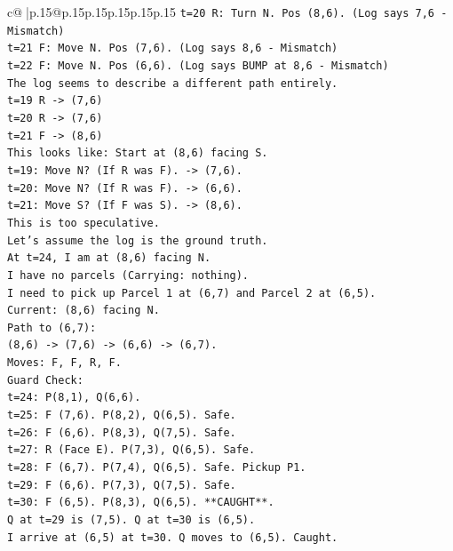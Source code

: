 \documentclass{article}
\begin{document}
{\begin{supertabular}{c@{$\;$}|p{.15\linewidth}@{}p{.15\linewidth}p{.15\linewidth}p{.15\linewidth}p{.15\linewidth}p{.15\linewidth}}
{{{\texttt{t=20 R: Turn N. Pos (8,6). (Log says 7,6 {-} Mismatch)} \\
\texttt{t=21 F: Move N. Pos (7,6). (Log says 8,6 {-} Mismatch)} \\
\texttt{t=22 F: Move N. Pos (6,6). (Log says BUMP at 8,6 {-} Mismatch)} \\
\texttt{The log seems to describe a different path entirely.} \\
\texttt{t=19 R {-}> (7,6)} \\
\texttt{t=20 R {-}> (7,6)} \\
\texttt{t=21 F {-}> (8,6)} \\
\texttt{This looks like: Start at (8,6) facing S.} \\
\texttt{t=19: Move N? (If R was F). {-}> (7,6).} \\
\texttt{t=20: Move N? (If R was F). {-}> (6,6).} \\
\texttt{t=21: Move S? (If F was S). {-}> (8,6).} \\
\texttt{This is too speculative.} \\
\texttt{Let's assume the log is the ground truth.} \\
\texttt{At t=24, I am at (8,6) facing N.} \\
\texttt{I have no parcels (Carrying: nothing).} \\
\texttt{I need to pick up Parcel 1 at (6,7) and Parcel 2 at (6,5).} \\
\texttt{Current: (8,6) facing N.} \\
\texttt{Path to (6,7):} \\
\texttt{(8,6) {-}> (7,6) {-}> (6,6) {-}> (6,7).} \\
\texttt{Moves: F, F, R, F.} \\
\texttt{Guard Check:} \\
\texttt{t=24: P(8,1), Q(6,6).} \\
\texttt{t=25: F (7,6). P(8,2), Q(6,5). Safe.} \\
\texttt{t=26: F (6,6). P(8,3), Q(7,5). Safe.} \\
\texttt{t=27: R (Face E). P(7,3), Q(6,5). Safe.} \\
\texttt{t=28: F (6,7). P(7,4), Q(6,5). Safe. Pickup P1.} \\
\texttt{t=29: F (6,6). P(7,3), Q(7,5). Safe.} \\
\texttt{t=30: F (6,5). P(8,3), Q(6,5). **CAUGHT**.} \\
\texttt{Q at t=29 is (7,5). Q at t=30 is (6,5).} \\
\texttt{I arrive at (6,5) at t=30. Q moves to (6,5). Caught.} \\
}}}
\end{supertabular}}
\end{document}
